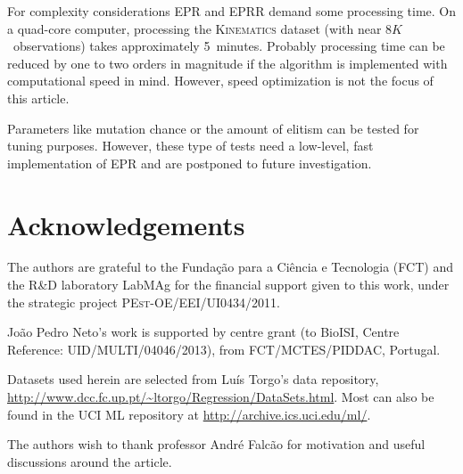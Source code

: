 \documentclass[review,preprint]{elsarticle}
\begin{document}
For complexity considerations \ac{EPR} and \ac{EPRR} demand some processing time. On a quad-core computer, processing the \textsc{Kinematics} dataset (with near $8K$~observations) takes approximately 5~minutes. Probably processing time can be reduced by one to two orders in magnitude if the algorithm is implemented with computational speed in mind. However, speed optimization is not the focus of this article. 

Parameters like mutation chance or the amount of elitism can be tested for tuning purposes. However, these type of tests need a low-level, fast implementation of \ac{EPR} and are postponed to future investigation.

\section*{Acknowledgements}

The authors are grateful to the Fundação para a Ciência e Tecnologia (FCT) and the  R\&D laboratory LabMAg for the financial support given to this work, under the strategic project \textsc{PEst-OE/EEI/UI0434/2011}. 

Jo\~ao Pedro Neto's work is supported by centre grant (to BioISI, Centre Reference: UID/MULTI/04046/2013), from FCT/MCTES/PIDDAC, Portugal.

Datasets used herein are selected from Luís Torgo's data repository, \url{http://www.dcc.fc.up.pt/~ltorgo/Regression/DataSets.html}. Most can also be found in the UCI ML repository at \url{http://archive.ics.uci.edu/ml/}.

The authors wish to thank professor André Falcão for motivation and useful discussions around the article.



    
\end{document}
